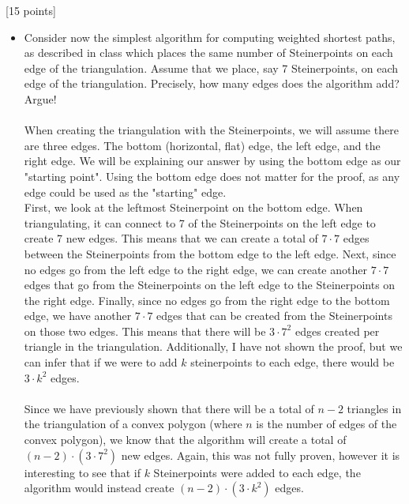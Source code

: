 \documentclass[12pt]{article}
\newcounter{ques}
\newenvironment{question}{\stepcounter{ques}{\noindent\bf Question \arabic{ques}:}}{\vspace{5mm}}
\begin{document}
\begin{question}[15 points]
\begin{itemize}
	\item Consider now the simplest algorithm for computing weighted shortest paths, as described in class which places the same number of Steinerpoints on each edge of the triangulation.   Assume that we place, say 7 Steinerpoints,  on each edge of the triangulation. Precisely, how many edges does the algorithm add? Argue!\\\\
  When creating the triangulation with the Steinerpoints, we will assume there are three edges. The bottom (horizontal, flat) edge, the left edge, and the right edge. We will be explaining our answer by using the bottom edge as our "starting point". Using the bottom edge does not matter for the proof, as any edge could be used as the "starting" edge.\\
  First, we look at the leftmost Steinerpoint on the bottom edge. When triangulating, it can connect to 7 of the Steinerpoints on the left edge to create 7 new edges. This means that we can create a total of $7\cdot 7$ edges between the Steinerpoints from the bottom edge to the left edge. Next, since no edges go from the left edge to the right edge, we can create another $7\cdot 7$ edges that go from the Steinerpoints on the left edge to the Steinerpoints on the right edge. Finally, since no edges go from the right edge to the bottom edge, we have another $7\cdot 7$ edges that can be created from the Steinerpoints on those two edges. This means that there will be $3\cdot 7^2$ edges created per triangle in the triangulation. Additionally, I have not shown the proof, but we can infer that if we were to add $k$ steinerpoints to each edge, there would be $3\cdot k^2$ edges.\\\\
  Since we have previously shown that there will be a total of $n-2$ triangles in the triangulation of a convex polygon (where $n$ is the number of edges of the convex polygon), we know that the algorithm will create a total of $(n-2)\cdot(3\cdot 7^2)$ new edges. Again, this was not fully proven, however it is interesting to see that if $k$ Steinerpoints were added to each edge, the algorithm would instead create $(n-2)\cdot(3\cdot k^2)$ edges.

\end{itemize}


\end{question}

\newpage
\end{document}

